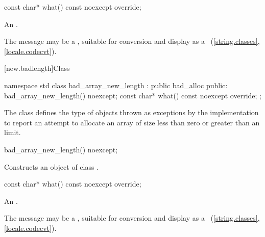 %
\begin{itemdecl}
const char* what() const noexcept override;
\end{itemdecl}

\begin{itemdescr}
\pnum
\returns
An  \ntbs{}.

\pnum
\remarks
The message may be a
,
suitable for conversion and display as a
~(\ref{string.classes}, \ref{locale.codecvt}).
\end{itemdescr}

%
[new.badlength]{Class }

\begin{codeblock}
namespace std {
  class bad_array_new_length : public bad_alloc {
  public:
    bad_array_new_length() noexcept;
    const char* what() const noexcept override;
  };
}
\end{codeblock}

\pnum
The class  defines the type of objects thrown as
exceptions by the implementation to report an attempt to allocate an array of size
less than zero or
greater than an  limit.

%
\begin{itemdecl}
bad_array_new_length() noexcept;
\end{itemdecl}

\begin{itemdescr}
\pnum
\effects Constructs an object of class .
\end{itemdescr}

%
\begin{itemdecl}
const char* what() const noexcept override;
\end{itemdecl}

\begin{itemdescr}
\pnum
\returns
An  \ntbs{}.

\pnum
\remarks
The message may be a
,
suitable for conversion and display as a
~(\ref{string.classes}, \ref{locale.codecvt}).
\end{itemdescr}

